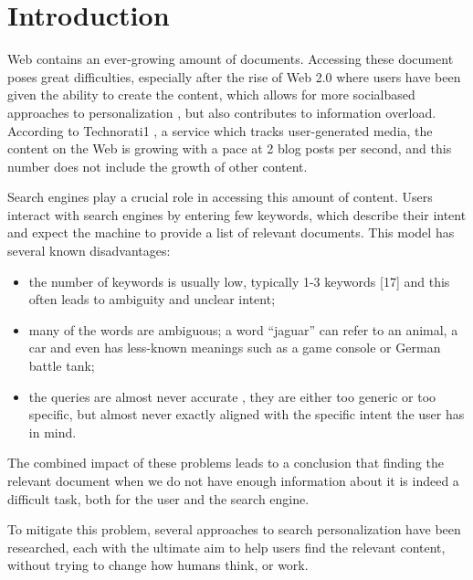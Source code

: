 \documentclass{acm_proc_article-sp} %
\begin{document}




\section{Introduction}

Web contains an ever-growing amount of documents. Accessing
these document poses great difficulties, especially
after the rise of Web 2.0 where users have been given the
ability to create the content, which allows for more socialbased
approaches to personalization \cite{Barla:1}, but also contributes
to information overload. According to Technorati1
, a service
which tracks user-generated media, the content on the Web
is growing with a pace at 2 blog posts per second, and this
number does not include the growth of other content.

Search engines play a crucial role in accessing this amount
of content. Users interact with search engines by entering
few keywords, which describe their intent and expect the
machine to provide a list of relevant documents. This model
has several known disadvantages:

\begin{itemize}  
	\item the number of keywords is usually low, typically 1-3
	keywords [17] and this often leads to ambiguity and
	unclear intent;
	\item many of the words are ambiguous; a word “jaguar”
	can refer to an animal, a car and even has less-known
	meanings such as a game console or German battle
	tank;
	\item the queries are almost never accurate \cite{Downey:2}, they are either
	too generic or too specific, but almost never exactly
	aligned with the specific intent the user has in
	mind.
\end{itemize}

The combined impact of these problems leads to a conclusion
that finding the relevant document when we do not have
enough information about it is indeed a difficult task, both
for the user and the search engine.

To mitigate this problem, several approaches to search personalization
have been researched, each with the ultimate
aim to help users find the relevant content, without trying
to change how humans think, or work.
\end{document}
